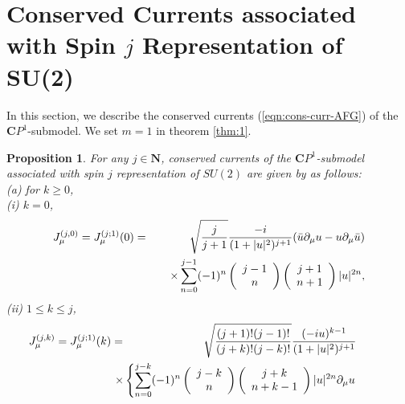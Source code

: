 \documentclass[makeidx,12pt,openany]{report}
\newtheorem{prop}[df]{Proposition}
\begin{document}
\section{Conserved Currents associated with Spin $j$ Representation of SU(2)}
In this section, we describe the conserved currents (\ref{eqn:cons-curr-AFG}) 
of the $\mathbf{C}P^1$-submodel. 
We set $m=1$ in theorem \ref{thm:1}. 
\begin{prop}\label{prop:2.1}
For any $j \in \mathbf{N}$, conserved currents 
of the $\mathbf{C}P^1$-submodel associated with spin $j$ 
representation of $SU(2)$ are given by as follows: \\
(a) for $k \geq 0$, \\
(i) $k=0$,
 \begin{eqnarray}
   J_{\mu}^{(j,0)}=
   J_{\mu}^{(j;1)}(0) &=&
    \sqrt{\frac{j}{j+1}}
    \frac{-i}{(1+|u|^2)^{j+1}} 
    (\bar{u} \partial_{\mu} u - u \partial_{\mu} \bar{u})
    \nonumber\\
  && \hspace{4mm} \times
    \sum_{n=0}^{j-1} 
    (-1)^n
    \left(
     \begin{array}{c}
      j-1 \\
       n  
     \end{array}
    \right)
    \left(
     \begin{array}{c}
       j+1 \\
       n+1  
     \end{array}
    \right) |u|^{2n} ,
  \label{eqn:j18} 
 \end{eqnarray}
(ii) $1 \leq k \leq j$,
 \begin{eqnarray}
  \hspace*{-10mm}
   J_{\mu}^{(j,k)}=
   J_{\mu}^{(j;1)}(k) &=&
    \sqrt{\frac{(j+1)!(j-1)!}{(j+k)!(j-k)!}}
    \frac{(-iu)^{k-1}}{(1+|u|^2)^{j+1}} \nonumber\\
  && \hspace{-6mm} \times
   \left\{  
    \sum_{n=0}^{j-k} 
    (-1)^n
    \left(
     \begin{array}{c}
      j-k \\
       n  
     \end{array}
    \right)
    \left(
     \begin{array}{c}
       j+k \\
       n+k-1  
     \end{array}
    \right)
    |u|^{2n} \partial_{\mu} u 
    \right. \nonumber\\

\end{eqnarray}
\end{prop}
\end{document}
